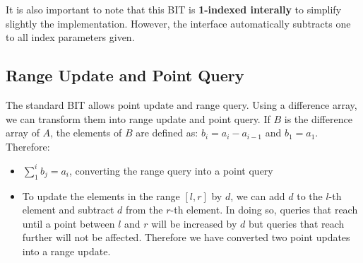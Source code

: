 It is also important to note that this BIT is \textbf{1-indexed interally} to simplify slightly 
the implementation. However, the interface automatically subtracts one to all index parameters
given.
\subsection*{Range Update and Point Query}
The standard BIT allows point update and range query. Using a difference array, we can 
transform them into range update and point query. If $B$ is the difference array
of $A$, the elements of $B$ are defined as:  $b_i=a_i- a_{i-1}$ and $b_1=a_1$.
Therefore:
\begin{itemize}
		\setlength{\itemsep}{2pt}
		\item $\sum_{1}^i b_j=a_i$, converting the range query into 
				a point query
		\item To update the elements in the range $[l,r]$ by $d$, we can add
				$d$ to the $l$-th element and subtract $d$ from the $r$-th element.
				In doing so, queries that reach until a point
				between $l$ and $r$ will be increased by $d$ but queries that reach 
				further will not be affected.
				Therefore we have converted two point updates into a range update.

\end{itemize}

